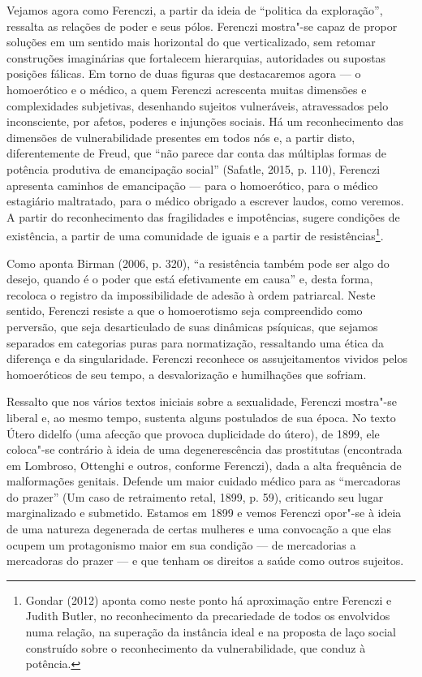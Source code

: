 Vejamos agora como Ferenczi, a partir da ideia de ``politica da
exploração'', ressalta as relações de poder e seus pólos. Ferenczi
mostra"-se capaz de propor soluções em um sentido mais horizontal do que
verticalizado, sem retomar construções imaginárias que fortalecem
hierarquias, autoridades ou supostas posições fálicas. Em torno de duas
figuras que destacaremos agora --- o homoerótico e o médico, a quem
Ferenczi acrescenta muitas dimensões e complexidades subjetivas,
desenhando sujeitos vulneráveis, atravessados pelo inconsciente, por
afetos, poderes e injunções sociais. Há um reconhecimento das dimensões
de vulnerabilidade presentes em todos nós e, a partir disto,
diferentemente de Freud, que ``não parece dar conta das múltiplas formas
de potência produtiva de emancipação social'' (Safatle, 2015, p. 110),
Ferenczi apresenta caminhos de emancipação --- para o homoerótico, para o
médico estagiário maltratado, para o médico obrigado a escrever laudos,
como veremos. A partir do reconhecimento das fragilidades e impotências,
sugere condições de existência, a partir de uma comunidade de iguais e a
partir de resistências\footnote{Gondar (2012) aponta como neste ponto há
  aproximação entre Ferenczi e Judith Butler, no reconhecimento da
  precariedade de todos os envolvidos numa relação, na superação da
  instância ideal e na proposta de laço social construído sobre o
  reconhecimento da vulnerabilidade, que conduz à potência.}.

Como aponta Birman (2006, p. 320), ``a resistência também pode ser algo
do desejo, quando é o poder que está efetivamente em causa'' e, desta
forma, recoloca o registro da impossibilidade de adesão à ordem
patriarcal. Neste sentido, Ferenczi resiste a que o homoerotismo seja
compreendido como perversão, que seja desarticulado de suas dinâmicas
psíquicas, que sejamos separados em categorias puras para normatização,
ressaltando uma ética da diferença e da singularidade. Ferenczi
reconhece os assujeitamentos vividos pelos homoeróticos de seu tempo, a
desvalorização e humilhações que sofriam.

Ressalto que nos vários textos iniciais sobre a sexualidade, Ferenczi
mostra"-se liberal e, ao mesmo tempo, sustenta alguns postulados de sua
época. No texto Útero didelfo (uma afecção que provoca duplicidade do
útero), de 1899, ele coloca"-se contrário à ideia de uma degenerescência
das prostitutas (encontrada em Lombroso, Ottenghi e outros, conforme
Ferenczi), dada a alta frequência de malformações genitais. Defende um
maior cuidado médico para as ``mercadoras do prazer'' (Um caso de
retraimento retal, 1899, p. 59), criticando seu lugar marginalizado e
submetido. Estamos em 1899 e vemos Ferenczi opor"-se à ideia de uma
natureza degenerada de certas mulheres e uma convocação a que elas
ocupem um protagonismo maior em sua condição --- de mercadorias a
mercadoras do prazer --- e que tenham os direitos a saúde como outros
sujeitos.

